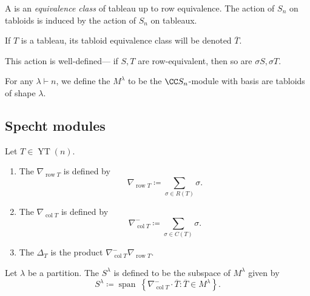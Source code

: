 \documentclass{article}
\DeclareMathOperator{\row}{row}
\DeclareMathOperator{\col}{col}
\DeclareMathOperator{\YT}{YT}
\begin{document}
\begin{definition}
    A  is an \textit{equivalence class} of tableau up to row equivalence.
    The action of $S_n$ on tabloids is induced by the action of $S_n$ on tableaux.

    If $T$ is a tableau, its tabloid equivalence class will be denoted $\overline{T}$.
\end{definition}

This action is well-defined--- if $S,T$ are row-equivalent, then so are $\sigma S, \sigma T$.

\begin{definition}
    For any $\lambda \vdash n$, we define the  $M^\lambda$ to be the $\CC S_n$-module with basis are tabloids of shape $\lambda$.
\end{definition}

\subsection{Specht modules}

\begin{definition}
    Let $T \in \YT(n)$.
    \begin{enumerate}[label=(\alph*)]
        \item 
            The  $\nabla_{\row T}$ is defined by
            \[
                \nabla_{\row T}
                \coloneq
                \sum_{\sigma \in R(T)}
                \sigma.
            \]
        \item 
            The  $\nabla_{\col T}$ is defined by
            \[
                \nabla_{\col T}^-
                \coloneq
                \sum_{\sigma \in C(T)}
                \sigma.
            \]
        \item 
            The  $\Delta_T$ is the product $\nabla_{\col T}^- \nabla_{\row T}$.
    \end{enumerate}
\end{definition}

\begin{definition}
    Let $\lambda$ be a partition.
    The  $S^\lambda$ is defined to be the subspace of $M^\lambda$ given by
    \[
        S^\lambda
        \coloneq
        \operatorname{span}\
        \left\{
            \nabla_{\col T}^- \cdot \overline{T} :
            \overline{T} \in M^\lambda
        \right\}.
    \]
\end{definition}
\end{document}

